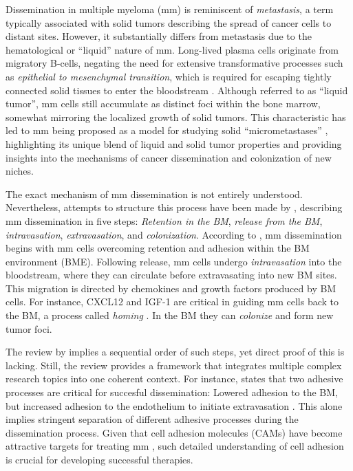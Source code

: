 Dissemination in multiple myeloma (\ac{mm}) is reminiscent of \emph{metastasis}, a
term typically associated with solid tumors describing the spread of cancer
cells to distant sites. However, it substantially differs from metastasis due to
the hematological or ``liquid'' nature of \ac{mm}. Long-lived plasma cells originate
from migratory B-cells, negating the need for extensive transformative processes
such as \emph{epithelial to mesenchymal transition}, which is required for
escaping tightly connected solid tissues to enter the bloodstream
\cite{ribattiEpithelialMesenchymalTransitionCancer2020}. Although referred to as
``liquid tumor'', \ac{mm} cells still accumulate as distinct foci within the bone
marrow, somewhat mirroring the localized growth of solid tumors. This
characteristic has led to \ac{mm} being proposed as a model for studying solid
``micrometastases'' \cite{ghobrialMyelomaModelProcess2012}, highlighting its
unique blend of liquid and solid tumor properties and providing insights into
the mechanisms of cancer dissemination and colonization of new niches.

The exact mechanism of \ac{mm} dissemination is not entirely understood.
Nevertheless, attempts to structure this process have been made by
\citet{zeissigTumourDisseminationMultiple2020}, describing \ac{mm} dissemination in
five steps: \emph{Retention in the BM}, \emph{release from the BM},
\emph{intravasation}, \emph{extravasation}, and \emph{colonization}. According
to \citet{zeissigTumourDisseminationMultiple2020}, \ac{mm} dissemination begins with
\ac{mm} cells overcoming retention and adhesion within the BM environment (BME).
Following release, \ac{mm} cells undergo \emph{intravasation} into the bloodstream,
where they can circulate before extravasating into new BM sites. This migration
is directed by chemokines and growth factors produced by BM cells. For instance,
CXCL12 and IGF-1 are critical in guiding \ac{mm} cells back to the BM, a process
called \emph{homing} \cite{vandebroekExtravasationHomingMechanisms2008}. In the
BM they can \emph{colonize} and form new tumor foci.

The review by \citet{zeissigTumourDisseminationMultiple2020} implies a
sequential order of such steps, yet direct proof of this is lacking. Still, the
review provides a framework that integrates multiple complex research topics
into one coherent context. For instance,
\citet{zeissigTumourDisseminationMultiple2020} states that two adhesive
processes are critical for succesful dissemination: Lowered adhesion to the BM,
but increased adhesion to the endothelium to initiate extravasation
\cite{asosinghUniquePathwayHoming2001a,
    mrozikTherapeuticTargetingNcadherin2015}. This alone implies stringent
separation of different adhesive processes during the dissemination process.
Given that cell adhesion molecules (CAMs) have become attractive targets for
treating \ac{mm} \cite{bouzerdanAdhesionMoleculesMultiple2022,
    katzAdhesionMoleculesLifelines2010}, such detailed understanding of cell
adhesion is crucial for developing successful therapies.



